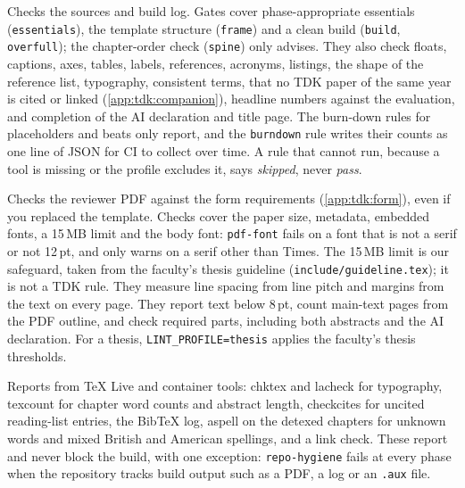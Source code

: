 \begin{description}[noitemsep]
  \item[source] Checks the sources and build log. Gates cover phase-appropriate essentials (\texttt{essentials}), the template structure (\texttt{frame}) and a clean build (\texttt{build}, \texttt{overfull}); the chapter-order check (\texttt{spine}) only advises. They also check floats, captions, axes, tables, labels, references, acronyms, listings, the shape of the reference list, typography, consistent terms, that no TDK paper of the same year is cited or linked (\cref{app:tdk:companion}), headline numbers against the evaluation, and completion of the AI declaration and title page. The burn-down rules for placeholders and beats only report, and the \texttt{burndown} rule writes their counts as one line of JSON for CI to collect over time. A rule that cannot run, because a tool is missing or the profile excludes it, says \emph{skipped}, never \emph{pass}.
  \item[pdf] Checks the reviewer PDF against the form requirements (\cref{app:tdk:form}), even if you replaced the template. Checks cover the paper size, metadata, embedded fonts, a 15\,MB limit and the body font: \texttt{pdf-font} fails on a font that is not a serif or not 12\,pt, and only warns on a serif other than Times. The 15\,MB limit is our safeguard, taken from the faculty's thesis guideline (\texttt{include/guideline.tex}); it is not a TDK rule. They measure line spacing from line pitch and margins from the text on every page. They report text below 8\,pt, count main-text pages from the PDF outline, and check required parts, including both abstracts and the AI declaration. For a thesis, \texttt{LINT\_PROFILE=thesis} applies the faculty's thesis thresholds.
  \item[tools] Reports from TeX Live and container tools: chktex and lacheck for typography, texcount for chapter word counts and abstract length, checkcites for uncited reading-list entries, the BibTeX log, aspell on the detexed chapters for unknown words and mixed British and American spellings, and a link check. These report and never block the build, with one exception: \texttt{repo-hygiene} fails at every phase when the repository tracks build output such as a PDF, a log or an \texttt{.aux} file.
\end{description}
